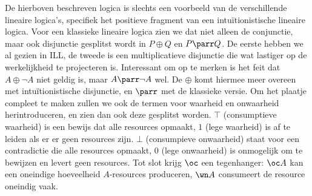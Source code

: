 \begin{figure}[ht]
\begin{theorem}
\vspace{4mm}

\hspace{5mm}

\vspace{4mm}
\hspace{5mm}

\vspace{4mm}

\end{theorem}
\end{figure}

\begin{aside}
  De hierboven beschreven logica is slechts een voorbeeld van de verschillende lineaire logica's, specifiek het positieve fragment van een intu\"itionistische lineaire logica. Voor een klassieke lineaire logica zien we dat niet alleen de conjunctie, maar ook disjunctie gesplitst wordt in $P \oplus Q$ en $P \parr Q$. De eerste hebben we al gezien in ILL, de tweede is een multiplicatieve disjunctie die wat lastiger op de werkelijkheid te projecteren is. Interessant om op te merken is het feit dat $A \oplus \neg A$ niet geldig is, maar $A \parr \neg A$ wel. De $\oplus$ komt hiermee meer overeen met intu\"itionistische disjunctie, en $\parr$ met de klassieke versie.
  Om het plaatje compleet te maken zullen we ook de termen voor waarheid en onwaarheid herintroduceren, en zien dan ook deze gesplitst worden. $\top$ (consumptieve waarheid) is een bewijs dat alle resources opmaakt, $1$ (lege waarheid) is af te leiden als er er geen resources zijn. $\bot$ (consumpieve onwaarheid) staat voor een contradictie die alle resources opmaakt, $0$ (lege onwaarheid) is onmogelijk om te bewijzen en levert geen resources. Tot slot krijg $\oc$ een tegenhanger: $\oc A$ kan een oneindige hoeveelheid $A$-resources produceren, $\wn A$ consumeert de resource oneindig vaak.
\end{aside}

